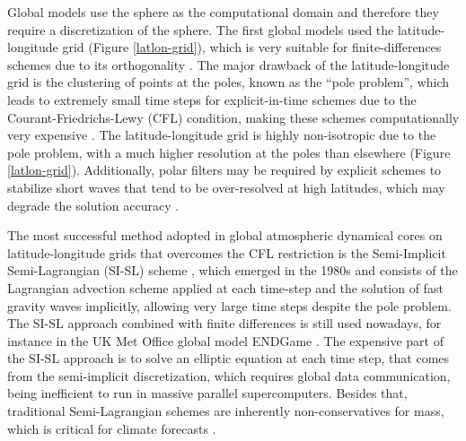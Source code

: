 Global models use the sphere as the computational domain and therefore they require a discretization
of the sphere. 
The first global models used the latitude-longitude grid (Figure \ref{latlon-grid}), which is
very suitable for finite-differences schemes due to its orthogonality \citep{will:2007}. The major drawback of the latitude-longitude grid
is the clustering of points at the poles, known as the ``pole problem'', which leads to extremely
small time steps for explicit-in-time schemes due to the Courant-Friedrichs-Lewy (CFL) condition, 
making these schemes computationally very expensive \citep{randall:2020}.
The latitude-longitude grid is highly non-isotropic due to the pole problem, with a much higher resolution at the poles than elsewhere (Figure \ref{latlon-grid}).
Additionally, polar filters may be required by explicit schemes to stabilize short waves that tend to be over-resolved at high latitudes, 
which may degrade the solution accuracy \citep{will:2007}.

The most successful method adopted in global atmospheric dynamical cores on latitude-longitude grids that overcomes the CFL 
restriction is the Semi-Implicit Semi-Lagrangian (SI-SL) scheme \citep{randall:2018}, which 
emerged in the 1980s and consists of the Lagrangian advection scheme applied at each time-step 
and the solution of fast gravity waves implicitly, allowing very large time steps despite the pole problem.
The SI-SL approach combined with finite differences is still used nowadays, for instance in 
the UK Met Office global model ENDGame \citep{wood:2014}.
The expensive part of the  SI-SL approach is to solve an elliptic equation at each time step,
that comes from the semi-implicit discretization, which requires global data communication,
being inefficient to run in massive parallel supercomputers. Besides that, 
traditional Semi-Lagrangian schemes are inherently non-conservatives for mass,
which is critical for climate forecasts \citep{will:2007}.

